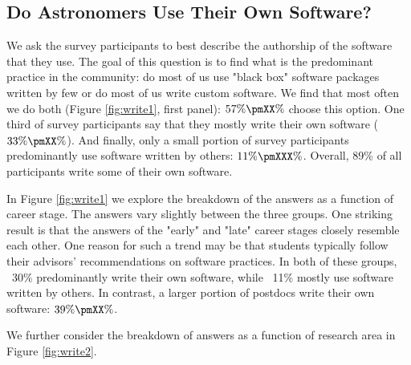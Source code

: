\subsection{Do Astronomers Use Their Own Software?}

We ask the survey participants to best describe the authorship of the software that they use. The goal of this question is to find what is the predominant practice in the community: do most of us use "black box" software packages written by few or do most of us write custom software. We find that most often we do both (Figure \ref{fig:write1}, first panel): $57\%\pmXX\%$ choose this option. One third of survey participants say that they mostly write their own software ($33\%\pmXX\%$). And finally, only a small portion of survey participants predominantly use software written by others: $11\%\pmXXX\%$. Overall, 89\% of all participants write some of their own software.

In Figure \ref{fig:write1} we explore the breakdown of the answers as a function of career stage. The answers vary slightly between the three groups. One striking result is that the answers of the "early" and "late" career stages closely resemble each other. One reason for such a trend may be that students typically follow their advisors' recommendations on software practices. In both of these groups, ~30\% predominantly write their own software, while ~11\% mostly use software written by others. In contrast, a larger portion of postdocs write their own software: $39\%\pmXX\%$. 

We further consider the breakdown of answers as a function of research area in Figure \ref{fig:write2}. 